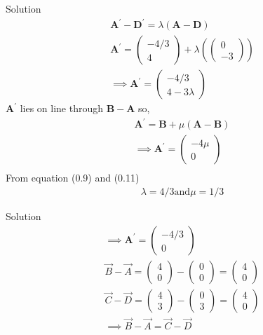 \documentclass{beamer}
\numberwithin{equation}{section}
\theoremstyle{remark}
\newcommand{\myvec}[1]{\ensuremath{\begin{pmatrix}#1\end{pmatrix}}}
\let\vec\mathbf
\begin{document}
\begin{frame}{Solution}
\begin{align}
\vec{A^{\prime}-D^{\prime}}=\lambda(\vec{A}-\vec{D})\\
\vec{A^{\prime}}=\myvec{-4/3\\4}+\lambda(\myvec{0\\-3})\\
\implies \vec{A^{\prime}}=\myvec{-4/3\\4-3\lambda}
\end{align}
 $\vec{A^{\prime}}$ lies on line through $\vec{B}-\vec{A}$ so,
 \begin{align}
 \vec{A^{\prime}}=\vec{B}+\mu(\vec{A}-\vec{B})\\
 \implies \vec{A^{\prime}}=\myvec{-4\mu\\0}\\
 \end{align}
 From equation (0.9) and (0.11)
 \begin{align}
 \lambda=4/3 \text{and} \mu=1/3
 \end{align}
    \end{frame}
    \begin{frame}{Solution}
\begin{align}
 \implies \vec{A^{\prime}}=\myvec{-4/3\\0}\\
    \Vec{B}-\Vec{A}=\myvec{4\\0}-\myvec{0\\0}=\myvec{4\\0}\\
    \Vec{C}-\Vec{D}=\myvec{4\\3}-\myvec{0\\3}=\myvec{4\\0}\\
\implies \Vec{B}-\Vec{A}=\Vec{C}-\Vec{D}
\end{align}
    \end{frame}
    
\end{document}

